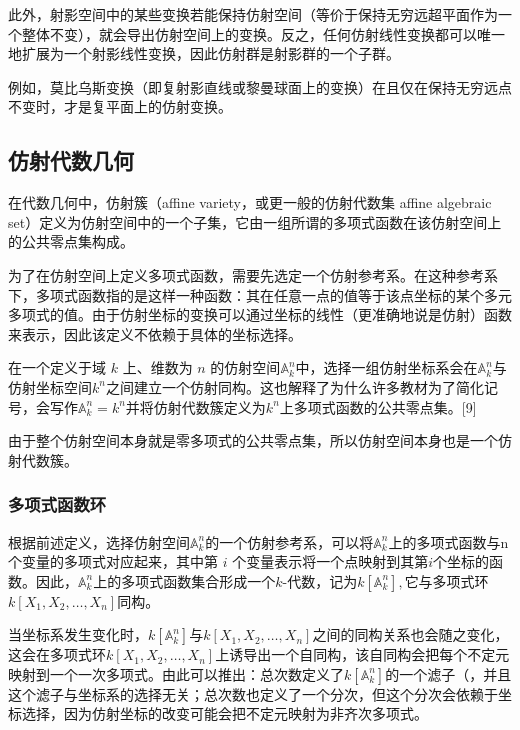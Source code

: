 此外，射影空间中的某些变换若能保持仿射空间（等价于保持无穷远超平面作为一个整体不变），就会导出仿射空间上的变换。反之，任何仿射线性变换都可以唯一地扩展为一个射影线性变换，因此仿射群是射影群的一个子群。

例如，莫比乌斯变换（即复射影直线或黎曼球面上的变换）在且仅在保持无穷远点不变时，才是复平面上的仿射变换。
\subsection{仿射代数几何}
在代数几何中，仿射簇（affine variety，或更一般的仿射代数集 affine algebraic set）定义为仿射空间中的一个子集，它由一组所谓的多项式函数在该仿射空间上的公共零点集构成。

为了在仿射空间上定义多项式函数，需要先选定一个仿射参考系。在这种参考系下，多项式函数指的是这样一种函数：其在任意一点的值等于该点坐标的某个多元多项式的值。由于仿射坐标的变换可以通过坐标的线性（更准确地说是仿射）函数来表示，因此该定义不依赖于具体的坐标选择。

在一个定义于域 $k$ 上、维数为 $n$ 的仿射空间$\mathbb{A}_k^n$中，选择一组仿射坐标系会在$\mathbb{A}_k^n$与仿射坐标空间$k^n$之间建立一个仿射同构。这也解释了为什么许多教材为了简化记号，会写作$\mathbb{A}_k^n = k^n$并将仿射代数簇定义为$k^n$上多项式函数的公共零点集。[9]

由于整个仿射空间本身就是零多项式的公共零点集，所以仿射空间本身也是一个仿射代数簇。
\subsubsection{多项式函数环}
根据前述定义，选择仿射空间$\mathbb{A}_k^n$的一个仿射参考系，可以将$\mathbb{A}_k^n$上的多项式函数与n个变量的多项式对应起来，其中第 $i$ 个变量表示将一个点映射到其第$i$个坐标的函数。因此，$\mathbb{A}_k^n$上的多项式函数集合形成一个$k$-代数，记为$k[\mathbb{A}_k^n],$它与多项式环$k[X_1, X_2, \dots, X_n]$同构。

当坐标系发生变化时，$k[\mathbb{A}_k^n]$与$k[X_1, X_2, \dots, X_n]$之间的同构关系也会随之变化，这会在多项式环$k[X_1, X_2, \dots, X_n]$上诱导出一个自同构，该自同构会把每个不定元映射到一个一次多项式。由此可以推出：总次数定义了$k[\mathbb{A}_k^n]$的一个滤子（，并且这个滤子与坐标系的选择无关；总次数也定义了一个分次，但这个分次会依赖于坐标选择，因为仿射坐标的改变可能会把不定元映射为非齐次多项式。
